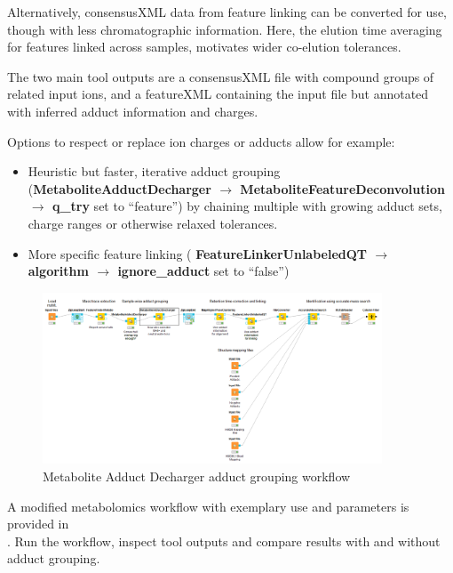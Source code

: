 \noindent Alternatively, consensusXML data from feature linking can be converted for use, though with less chromatographic information. Here, the elution time averaging for features linked across samples, motivates wider co-elution tolerances.

\noindent The two main tool outputs are a consensusXML file with compound groups of related input ions, and a featureXML containing the input file but annotated with inferred adduct information and charges.

\noindent Options to respect or replace ion charges or adducts allow for example:
\begin{itemize}
\item Heuristic but faster, iterative adduct grouping (\textbf{MetaboliteAdductDecharger $\rightarrow$ MetaboliteFeatureDeconvolution $\rightarrow$ q\_try} set to “feature”) by chaining multiple  with growing adduct sets, charge ranges or otherwise relaxed tolerances.
\item More specific feature linking (\textbf{ FeatureLinkerUnlabeledQT $\rightarrow$ algorithm $\rightarrow$ ignore\_adduct} set to “false”)
\end{itemize}

\begin{figure}[htbp]
  \centering
  \includegraphics[width=0.90\textwidth]{graphics/metabo/mad.png}
  \caption{Metabolite Adduct Decharger adduct grouping workflow}
  \label{fig:mad}
\end{figure}

\begin{task}
A modified metabolomics workflow with exemplary  use and parameters is provided in\\ . Run the workflow, inspect tool outputs and compare  results with and without adduct grouping.
\end{task}

